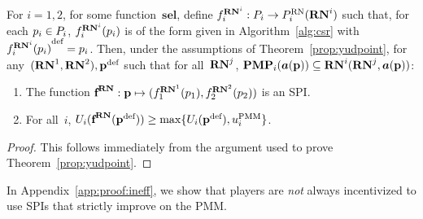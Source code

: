 \documentclass[sigconf]{aamas}
\newcommand{\selection}{sel}%
\newcommand{\renegb}{\mathbf{\selection}}
\theoremstyle{definition}
\begin{document}
\begin{proposition}
\label{prop:itspi}
For $i=1,2$,
for some \selfunction{} function~$\renegb$,
define 
$f_i^{\mathbf{RN}^{i}}: P_i \rightarrow P_i^{\textnormal{RN}}(\mathbf{RN}^{i})$ such that,
for each $p_i \in P_i$, $f_i^{\mathbf{RN}^{i}}(p_i)$
is of the form given in Algorithm~\ref{alg:csr} with 
${f_i^{\mathbf{RN}^{i}}(p_i)}^{\textnormal{def}} = p_i$.
Then, 
under the assumptions of 
Theorem~\ref{prop:yudpoint},
for any~$(\mathbf{RN}^{1}, \mathbf{RN}^{2}), {\textbf{p}}^{\textnormal{def}}$
such that
for all~$\mathbf{RN}^{j}$,
$\mathbf{PMP}_i(\boldsymbol{a}(\textbf{p})) \subseteq \mathbf{RN}^{i}(\mathbf{RN}^{j}, \boldsymbol{a}(\textbf{p}))$:
\begin{enumerate}
    \item The function
    $\textbf{f}^{\mathbf{RN}}: \textbf{p} \mapsto (f_1^{\mathbf{RN}^{1}}(p_1), f_2^{\mathbf{RN}^{2}}(p_2))$ is an SPI.
    \item For all~$i$,
    $U_i(\textbf{f}^{\mathbf{RN}}({\textbf{p}}^{\textnormal{def}})) \geq \max\{U_i({\textbf{p}}^{\textnormal{def}}), u_i^{\textnormal{PMM}}\}$.
\end{enumerate}
\end{proposition}

\begin{proof}
This follows
immediately
from the argument used to prove 
Theorem~\ref{prop:yudpoint}.
\end{proof}

In
Appendix~\ref{app:proof:ineff},
we
show that 
players are \textit{not}
always incentivized
to use SPIs
that strictly
improve on the PMM. 
\end{document}
